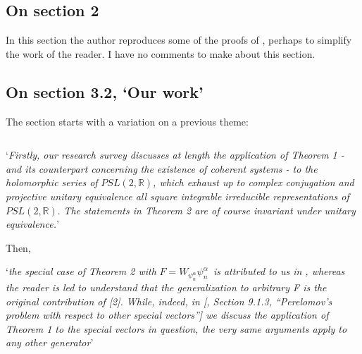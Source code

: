 \documentclass[11pt,reqno]{amsart}
\numberwithin{equation}{section}
\theoremstyle{plain}
\theoremstyle{definition}
\theoremstyle{remark}
\begin{document}
\subsection{On section 2}

In this section the author reproduces some of the proofs of \cite{Jordi},
perhaps to simplify the work of the reader. I have no comments to make about
this section.

\subsection{On section 3.2, `Our work'}

The section starts with a variation on a previous theme:

\begin{equation*}
\end{equation*}

`\emph{Firstly, our research survey \cite{Jordi} discusses at length the
application of Theorem 1 - and its counterpart concerning the existence of
coherent systems - to the holomorphic series of }$PSL(2,\mathbb{R})$\emph{,
which exhaust up to complex conjugation and projective unitary equivalence
all square integrable irreducible representations of }$PSL(2,\mathbb{R})$. 
\emph{The statements in Theorem 2 are of course invariant under unitary
equivalence.}'%
\begin{equation*}
\end{equation*}


Then,%
\begin{equation*}
\end{equation*}

`\emph{the special case of Theorem 2 with }$F=W_{\psi _{n}^{\alpha }}\psi
_{n}^{\alpha }$\emph{\ is attributed to us in \cite{Affine}, whereas the
reader is led to understand that the generalization to arbitrary F is the
original contribution of [2]. While, indeed, in [\cite{Jordi}, Section
9.1.3, \textquotedblleft Perelomov's problem with respect to other special
vectors\textquotedblright ] we discuss the application of Theorem 1 to the
special vectors in question, the very same arguments apply to any other
generator}'%
\begin{equation*}
\end{equation*}
\end{document}
